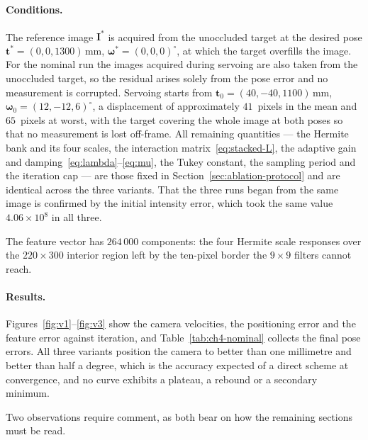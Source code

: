 \paragraph{Conditions.}
The reference image $\mathbf{I}^{*}$ is acquired from the unoccluded target at
the desired pose $\mathbf{t}^{*}=(0,0,1300)\,\mathrm{mm}$,
$\boldsymbol{\omega}^{*}=(0,0,0)^{\circ}$, at which the target overfills the
image. For the nominal run the images acquired during servoing are also taken
from the unoccluded target, so the residual arises solely from the pose error
and no measurement is corrupted. Servoing starts from
$\mathbf{t}_{0}=(40,-40,1100)\,\mathrm{mm}$,
$\boldsymbol{\omega}_{0}=(12,-12,6)^{\circ}$, a displacement of approximately
$41$~pixels in the mean and $65$~pixels at worst, with the target covering the
whole image at both poses so that no measurement is lost off-frame. All
remaining quantities --- the Hermite bank and its four scales, the interaction
matrix~\eqref{eq:stacked-L}, the adaptive gain and
damping~\eqref{eq:lambda}--\eqref{eq:mu}, the Tukey constant, the sampling
period and the iteration cap --- are those fixed in
Section~\ref{sec:ablation-protocol} and are identical across the three
variants. That the three runs began from the same image is confirmed by the
initial intensity error, which took the same value $4.06\times10^{8}$ in all
three.

The feature vector has $264\,000$ components: the four Hermite scale responses
over the $220\times300$ interior region left by the ten-pixel border the
$9\times9$ filters cannot reach.

\paragraph{Results.}
Figures~\ref{fig:v1}--\ref{fig:v3} show the camera velocities, the positioning
error and the feature error against iteration, and
Table~\ref{tab:ch4-nominal} collects the final pose errors. All three variants
position the camera to better than one millimetre and better than
half a degree, which is the accuracy expected of a direct scheme at
convergence, and no curve exhibits a plateau, a rebound or a secondary
minimum.

Two observations require comment, as both bear on how the remaining sections
must be read.

